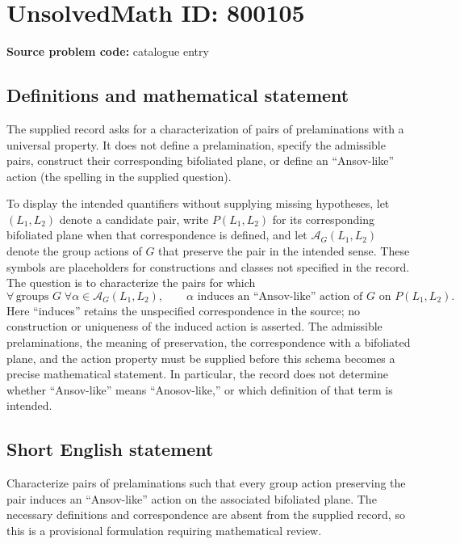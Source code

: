 \documentclass[11pt]{article}
\begin{document}
\section*{UnsolvedMath ID: 800105}
\textbf{Source problem code:} catalogue entry
\subsection{Definitions and mathematical statement}
The supplied record asks for a characterization of pairs of prelaminations with a universal property. It does not define a prelamination, specify the admissible pairs, construct their corresponding bifoliated plane, or define an ``Ansov-like'' action (the spelling in the supplied question).

To display the intended quantifiers without supplying missing hypotheses, let \((L_1,L_2)\) denote a candidate pair, write \(P(L_1,L_2)\) for its corresponding bifoliated plane when that correspondence is defined, and let \(\mathcal A_G(L_1,L_2)\) denote the group actions of \(G\) that preserve the pair in the intended sense. These symbols are placeholders for constructions and classes not specified in the record. The question is to characterize the pairs for which
\[
\forall\,\text{groups }G\;\forall\alpha\in\mathcal A_G(L_1,L_2),\qquad
\alpha\text{ induces an ``Ansov-like'' action of }G\text{ on }P(L_1,L_2).
\]
Here ``induces'' retains the unspecified correspondence in the source; no construction or uniqueness of the induced action is asserted. The admissible prelaminations, the meaning of preservation, the correspondence with a bifoliated plane, and the action property must be supplied before this schema becomes a precise mathematical statement. In particular, the record does not determine whether ``Ansov-like'' means ``Anosov-like,'' or which definition of that term is intended.
\subsection{Short English statement}
Characterize pairs of prelaminations such that every group action preserving the pair induces an ``Ansov-like'' action on the associated bifoliated plane. The necessary definitions and correspondence are absent from the supplied record, so this is a provisional formulation requiring mathematical review.
\end{document}
